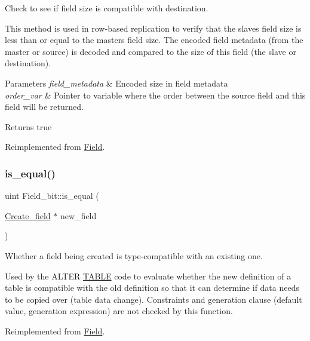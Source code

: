 Check to see if field size is compatible with destination.

This method is used in row-\/based replication to verify that the slave\textquotesingle{}s field size is less than or equal to the master\textquotesingle{}s field size. The encoded field metadata (from the master or source) is decoded and compared to the size of this field (the slave or destination).


\begin{DoxyParams}{Parameters}
{\em field\+\_\+metadata} & Encoded size in field metadata \\
\hline
{\em order\+\_\+var} & Pointer to variable where the order between the source field and this field will be returned.\\
\hline
\end{DoxyParams}
\begin{DoxyReturn}{Returns}
{\ttfamily true} 
\end{DoxyReturn}


Reimplemented from \mbox{\hyperlink{classField_ab603b7f21a9116358e400dd7282cee50}{Field}}.

\mbox{\label{classField__bit_a92ecc819aaa815e8bd059db03c17d680}} 
\subsubsection{\texorpdfstring{is\+\_\+equal()}{is\_equal()}}
{\footnotesize\ttfamily uint Field\+\_\+bit\+::is\+\_\+equal (\begin{DoxyParamCaption}\item[{\mbox{\hyperlink{classCreate__field}{Create\+\_\+field}} $\ast$}]{new\+\_\+field }\end{DoxyParamCaption})\hspace{0.3cm}{\ttfamily [virtual]}}

Whether a field being created is type-\/compatible with an existing one.

Used by the A\+L\+T\+ER \mbox{\hyperlink{structTABLE}{T\+A\+B\+LE}} code to evaluate whether the new definition of a table is compatible with the old definition so that it can determine if data needs to be copied over (table data change). Constraints and generation clause (default value, generation expression) are not checked by this function. 

Reimplemented from \mbox{\hyperlink{classField_a8c99e9c66c1d578a339ae87d128843b7}{Field}}.

